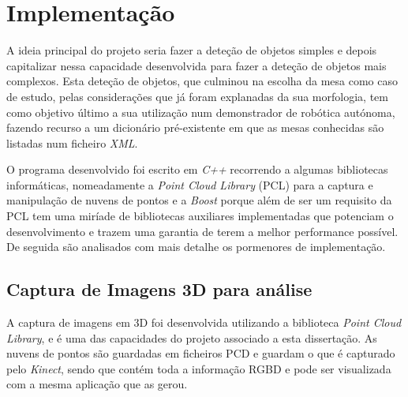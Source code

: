 \chapter{Implementação}\label{chap:chap4}



A ideia principal do projeto seria fazer a deteção de objetos simples e depois capitalizar nessa capacidade desenvolvida para fazer a deteção de objetos mais complexos. Esta deteção de objetos, que culminou na escolha da mesa como caso de estudo, pelas considerações que já foram explanadas da sua morfologia, tem como objetivo último a sua utilização num demonstrador de robótica autónoma, fazendo recurso a um dicionário pré-existente em que as mesas conhecidas são listadas num ficheiro \emph{XML}.

O programa desenvolvido foi escrito em \emph{C++} recorrendo a algumas bibliotecas informáticas, nomeadamente a \emph{Point Cloud Library} (PCL) para a captura e manipulação de nuvens de pontos e a \emph{Boost} porque além de ser um requisito da PCL tem uma miríade de bibliotecas auxiliares implementadas que potenciam o desenvolvimento e trazem uma garantia de terem a melhor performance possível. De seguida são analisados com mais detalhe os pormenores de implementação.

\section{Captura de Imagens 3D para análise }

A captura de imagens em 3D foi desenvolvida utilizando a biblioteca \emph{Point Cloud Library}, e é uma das capacidades do projeto associado a esta dissertação. As nuvens de pontos são guardadas em ficheiros PCD e guardam o que é capturado pelo \emph{Kinect}, sendo que contém toda a informação RGBD e pode ser visualizada com a mesma aplicação que as gerou.

